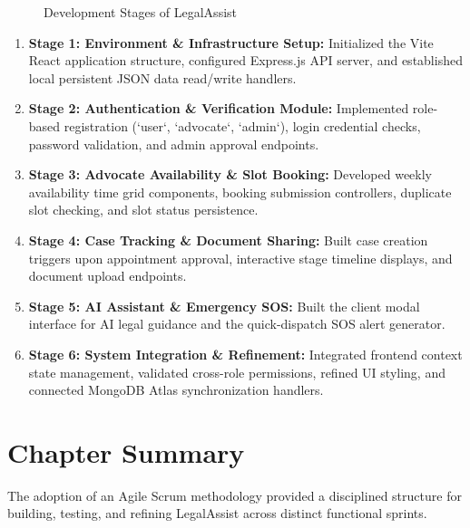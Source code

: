 \begin{figure}[h!]
    \centering
    \caption{Development Stages of LegalAssist}
    \label{fig:dev_stages}
\end{figure}

\begin{enumerate}
    \item \textbf{Stage 1: Environment \& Infrastructure Setup:} Initialized the Vite React application structure, configured Express.js API server, and established local persistent JSON data read/write handlers.
    \item \textbf{Stage 2: Authentication \& Verification Module:} Implemented role-based registration (`user`, `advocate`, `admin`), login credential checks, password validation, and admin approval endpoints.
    \item \textbf{Stage 3: Advocate Availability \& Slot Booking:} Developed weekly availability time grid components, booking submission controllers, duplicate slot checking, and slot status persistence.
    \item \textbf{Stage 4: Case Tracking \& Document Sharing:} Built case creation triggers upon appointment approval, interactive stage timeline displays, and document upload endpoints.
    \item \textbf{Stage 5: AI Assistant \& Emergency SOS:} Built the client modal interface for AI legal guidance and the quick-dispatch SOS alert generator.
    \item \textbf{Stage 6: System Integration \& Refinement:} Integrated frontend context state management, validated cross-role permissions, refined UI styling, and connected MongoDB Atlas synchronization handlers.
\end{enumerate}

\section{Chapter Summary}
The adoption of an Agile Scrum methodology provided a disciplined structure for building, testing, and refining LegalAssist across distinct functional sprints.

\clearpage
